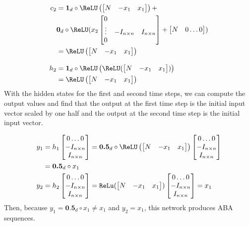 \begin{align*}
  c_2 &= \textbf{1}_d \circ \ReLU \left( \begin{bmatrix} N & -x_1 & x_1 \end{bmatrix}\right) +\\
      & \textbf{0}_d\circ \ReLU(x_2\begin{bmatrix} 0 &  & \\ \vdots & -I_{n \times n} & I_{n \times n}\\ 0 & &  \end{bmatrix} + \begin{bmatrix} N & 0 \dots 0\end{bmatrix}) \\
      &= \ReLU \left( \begin{bmatrix} N & -x_1 & x_1 \end{bmatrix}\right) \\[2ex]
  h_2 &= \textbf{1}_d \circ \ReLU\left(\ReLU ( \begin{bmatrix} N & -x_1 & x_1 \end{bmatrix})\right) \\
      &= \ReLU \left( \begin{bmatrix} N & -x_1 & x_1 \end{bmatrix}\right)
\end{align*}
%
With the hidden states for the first and second time steps, we can compute the output values and find that the output at the first time step is the initial input vector scaled by one half and the output at the second time step is the initial input vector.

\begin{align*}
  y_1 &= h_1\begin{bmatrix} 0 \dots 0 \\ -I_{n \times n} \\ I_{n \times n}  \end{bmatrix} = \textbf{0.5}_d\circ \ReLU\left( \begin{bmatrix} N & -x_1 & x_1 \end{bmatrix}\right) \begin{bmatrix} 0 \dots 0 \\ -I_{n \times n} \\ I_{n \times n}  \end{bmatrix} \\
      &= \textbf{0.5}_d\circ x_1\\
  y_2 &= h_2\begin{bmatrix} 0 \dots 0 \\ -I_{n \times n} \\ I_{n \times n}  \end{bmatrix} = \texttt{ReLu} ( \begin{bmatrix} N & -x_1 & x_1 \end{bmatrix}) \begin{bmatrix} 0 \dots 0 \\ -I_{n \times n} \\ I_{n \times n}  \end{bmatrix} = x_1
\end{align*}
%
Then, because $y_1 = \textbf{0.5}_d\circ x_1 \not = x_1$ and $y_2 = x_1$, this network produces ABA sequences.



